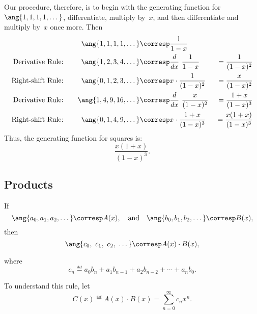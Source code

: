Our procedure, therefore, is to begin with the generating function for
$\ang{1, 1, 1, 1, \dots}$, differentiate, multiply by~$x$, and then
differentiate and multiply by~$x$ once more.  Then
%
\begingroup
{}
\begin{alignat*}{3}
&\quad&
\ang{1, 1, 1, 1, \dots}  & \corresp \frac{1}{1-x}
&\enskip& \\
\text{Derivative Rule:} &&
\ang{1, 2, 3, 4, \dots}  & \corresp \frac{d}{dx} \ \frac{1}{1-x}
                                          &{}= \frac{1}{(1-x)^2}\\
\text{Right-shift Rule:} &&
\ang{0, 1, 2, 3, \dots}  & \corresp x \cdot \frac{1}{(1-x)^2}
                                          &{}= \frac{x}{(1-x)^2}\\
\text{Derivative Rule:} &&
\ang{1, 4, 9, 16, \dots} & \corresp \frac{d}{dx} \ \frac{x}{(1-x)^2}
                                          &{}= \frac{1+x}{(1-x)^3} \\
\text{Right-shift Rule:} &&
\ang{0, 1, 4, 9, \dots}  & \corresp x \cdot \frac{1+x}{(1-x)^3}
                                          &{}= \frac{x(1+x)}{(1-x)^3}
\end{alignat*}
\endgroup
%
Thus, the generating function for squares is:
%
\begin{equation}\label{squares_gen_func}
    \frac{x(1+x)}{(1-x)^3}.
\end{equation}

\subsection{Products}

\begin{rul}
\label{rule:product}
If
%
\[
\ang{a_0, a_1, a_2, \dots} \corresp A(x),\quad \text{and}\quad
\ang{b_0, b_1, b_2, \dots} \corresp B(x),
\]
%
then
%
\[
\ang{c_0,\ c_1 ,\ c_2,\ \dots} \corresp A(x) \cdot B(x),
\]
\end{rul}
where
\[
c_n \eqdef a_0 b_n + a_1 b_{n-1} + a_2 b_{n-2} + \cdots + a_n b_0.
\]

To understand this rule, let
\[
C(x) \eqdef A(x) \cdot B(x) = \sum_{n=0}^{\infty} c_n x^n.
\]

